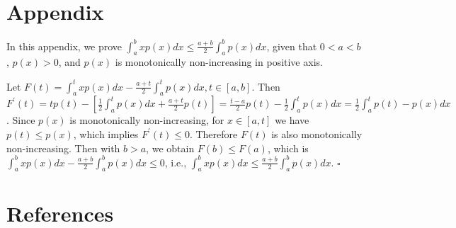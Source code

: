 \documentclass[smallabstract,smallcaptions]{dccpaper}
\begin{document}
\section*{Appendix}
\label{sec:appendix}

In this appendix, we prove $\int_a^b xp(x)dx \le \frac{a+b}{2} \int_a^b p(x)dx$, given that $0 < a < b$, $p(x) > 0$, and $p(x)$ is monotonically non-increasing in positive axis.

Let $F(t) = \int_a^t xp(x)dx - \frac{a+t}{2} \int_a^t p(x)dx, t \in [a, b]$. Then $F^{\prime}(t) = tp(t) - [\frac{1}{2}\int_a^t p(x)dx + \frac{a+t}{2}p(t)] = \frac{t-a}{2}p(t) - \frac{1}{2}\int_a^t p(x)dx = \frac{1}{2}\int_a^t p(t)-p(x)dx $. Since $p(x)$ is monotonically non-increasing, for $x \in [a, t]$ we have $p(t) \le p(x)$, which implies $F^{\prime}(t) \le 0$. Therefore $F(t)$ is also monotonically non-increasing. Then with $b > a$, we obtain $F(b) \le F(a)$, which is $\int_a^b xp(x)dx - \frac{a+b}{2} \int_a^b p(x)dx \le 0$, i.e., $\int_a^b xp(x)dx \le \frac{a+b}{2} \int_a^b p(x)dx$. $\square$

\section*{References}


\end{document}
